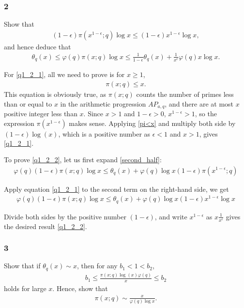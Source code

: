 \documentclass{article}
\theoremstyle{definition}
\theoremstyle{definition}
\theoremstyle{remark}
\begin{document}
\subsubsection*{2}
Show that
\begin{align}\label{q1_2_1}
(1-\epsilon)\pi(x^{1-\epsilon}; q) \log x \leq (1-\epsilon)x^{1-\epsilon} \log x,
\end{align}
and hence deduce that
\begin{align}\label{q1_2_2}
\theta_q(x) \leq \varphi(q)\pi(x; q) \log x \leq \frac{1}{1-\epsilon} \theta_q(x) + \frac{1}{x^{\epsilon}} \varphi(q)x \log x.
\end{align} 

For \eqref{q1_2_1}, all we need to prove is for $x \geq 1$,
\begin{align} \label{pi<x}
	\pi(x; q) \leq x.
\end{align}
This equation is obviously true, as $\pi(x;q)$ counts the number of primes less than or equal to $x$ in the arithmetic progression $AP_{a,q}$, and there are at most $x$ positive integer less than $x$.
Since $x > 1$ and $1-\epsilon > 0$, $x^{1-\epsilon} > 1$, so the expression $\pi(x^{1- \epsilon})$ makes sense.
Applying \eqref{pi<x} and multiply both side by $(1-\epsilon)\log(x)$, which is a positive number as $\epsilon <1$ and $x > 1$, gives \eqref{q1_2_1}.

To prove \eqref{q1_2_2}, let us first expand \eqref{second_half}:
\begin{align*}
	\varphi(q)(1-\epsilon)\pi(x; q) \log x \leq \theta_q(x) + \varphi(q) \log x (1 - \epsilon)\pi(x^{1-\epsilon}; q)
\end{align*}

Apply equation \eqref{q1_2_1} to the second term on the right-hand side, we get 
\begin{align*}
	\varphi(q)(1-\epsilon)\pi(x; q) \log x \leq \theta_q(x) + \varphi(q) \log x (1 - \epsilon)x^{1-\epsilon} \log x
\end{align*}

Divide both sides by the positive number $(1- \epsilon)$, and write $x^{1-\epsilon}$ as $x \frac{1}{x^{\epsilon}}$ gives the desired result \eqref{q1_2_2}.

\subsubsection*{3}
Show that if $\theta_q(x) \sim x$, then for any $b_1 < 1 < b_2$,
\begin{align}\label{bound}
b_1 \leq \frac{\pi(x; q)\log(x)\varphi(q)}{x} \leq b_2
\end{align}
holds for large $x$. 
Hence, show that
\begin{align}\label{true_bound}
 \pi(x; q) \sim \frac{x}{\varphi(q) \log x}.
\end{align}
\end{document}
